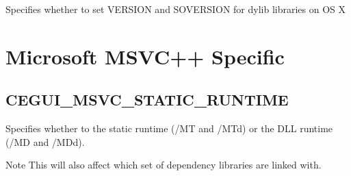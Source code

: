 Specifies whether to set V\+E\+R\+S\+I\+ON and S\+O\+V\+E\+R\+S\+I\+ON for dylib libraries on OS X\hypertarget{build_options_build_options_msvc}{}\section{Microsoft M\+S\+V\+C++ Specific}\label{build_options_build_options_msvc}
\hypertarget{build_options_build_options_msvc_static_runtime}{}\subsection{C\+E\+G\+U\+I\+\_\+\+M\+S\+V\+C\+\_\+\+S\+T\+A\+T\+I\+C\+\_\+\+R\+U\+N\+T\+I\+ME}\label{build_options_build_options_msvc_static_runtime}
Specifies whether to the static runtime (/\+MT and /\+M\+Td) or the D\+LL runtime (/\+MD and /\+M\+Dd). \begin{DoxyNote}{Note}
This will also affect which set of dependency libraries are linked with. 
\end{DoxyNote}

